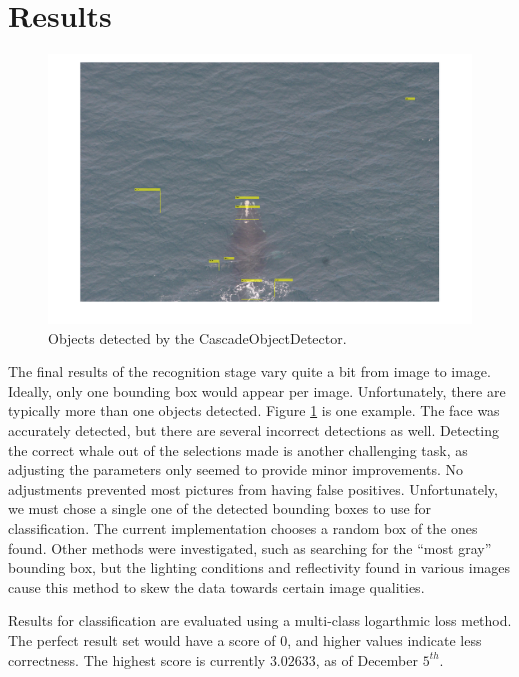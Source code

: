 \documentclass[10pt]{IEEEtran}
\newcommand{\?}{\stackrel{?}{=}}
\begin{document}
\section{Results}
\begin{figure}[H]
\begin{center}
\captionsetup{justification=centering}
\includegraphics[scale=.25]{detect.png}
\caption{Objects detected by the CascadeObjectDetector.}
\label{detect}
\end{center}
\end{figure} 

The final results of the recognition stage vary quite a bit from image to image.
Ideally, only one bounding box would appear per image. Unfortunately, there
are typically more than one objects detected. Figure \ref{detect} is one example.
The face was accurately detected, but there are several incorrect detections as 
well. Detecting the correct whale out of the selections made is another challenging
task, as adjusting the parameters only seemed to provide minor improvements. No
adjustments prevented most pictures from having false positives.
Unfortunately, we must chose a single one of the detected bounding boxes to 
use for classification. The current implementation chooses a random box of the
ones found. Other methods were investigated, such as searching for the ``most
gray'' bounding box, but the lighting conditions and reflectivity found in 
various images cause this method to skew the data towards certain image qualities.

Results for classification are evaluated using a multi-class logarthmic loss 
method\cite{kaggle_eval}. The perfect result set would have a score of $0$, 
and higher values indicate less correctness. The highest score is currently
$3.02633$, as of December $5^{th}$. 
\end{document}
